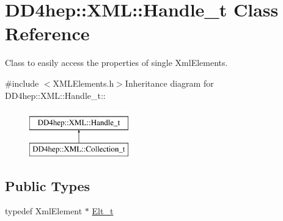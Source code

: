 \hypertarget{class_d_d4hep_1_1_x_m_l_1_1_handle__t}{
\section{DD4hep::XML::Handle\_\-t Class Reference}
\label{class_d_d4hep_1_1_x_m_l_1_1_handle__t}
}


Class to easily access the properties of single XmlElements.  


{\ttfamily \#include $<$XMLElements.h$>$}Inheritance diagram for DD4hep::XML::Handle\_\-t::\begin{figure}[H]
\begin{center}
\leavevmode
\includegraphics[height=2cm]{class_d_d4hep_1_1_x_m_l_1_1_handle__t}
\end{center}
\end{figure}
\subsection*{Public Types}
\begin{DoxyCompactItemize}
\item 
typedef XmlElement $\ast$ \hyperlink{class_d_d4hep_1_1_x_m_l_1_1_handle__t_a81a72155f29971b37652430a334a6b30}{Elt\_\-t}
\end{DoxyCompactItemize}
